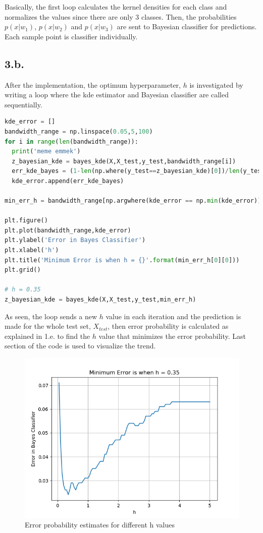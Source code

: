 \documentclass[11pt]{article}
\begin{document}
Basically, the first loop calculates the kernel densities for each class and normalizes the values since there are only 3 classes. Then, the probabilities $p(x|w_1)$, $p(x|w_2)$ and $p(x|w_3)$ are sent to Bayesian classifier for predictions. Each sample point is classifier individually.

\subsection*{3.b.}

After the implementation, the optimum hyperparameter, $h$ is investigated by writing a loop where the kde estimator and Bayesian classifier are called sequentially.

\begin{lstlisting}[language=Python, caption=kde hyperparameter optimization]
kde_error = []
bandwidth_range = np.linspace(0.05,5,100)
for i in range(len(bandwidth_range)):
  print('meme emmek')
  z_bayesian_kde = bayes_kde(X,X_test,y_test,bandwidth_range[i])
  err_kde_bayes = (1-len(np.where(y_test==z_bayesian_kde)[0])/len(y_test))
  kde_error.append(err_kde_bayes)

min_err_h = bandwidth_range[np.argwhere(kde_error == np.min(kde_error))]

plt.figure()
plt.plot(bandwidth_range,kde_error)
plt.ylabel('Error in Bayes Classifier')
plt.xlabel('h')
plt.title('Minimum Error is when h = {}'.format(min_err_h[0][0]))
plt.grid()

# h = 0.35
z_bayesian_kde = bayes_kde(X,X_test,y_test,min_err_h)
\end{lstlisting}

As seen, the loop sends a new $h$ value in each iteration and the prediction is made for the whole test set, $X_{test}$, then error probability is calculated as explained in 1.e. to find the $h$ value that minimizes the error probability. Last section of the code is used to visualize the trend.

\begin{figure}[H]
\centering
\includegraphics[width=0.75\columnwidth]{h_bayes.png}
\captionsetup{justification=centering}
\caption{Error probability estimates for different h values}
\label{fig:h}
\end{figure}
\end{document}
